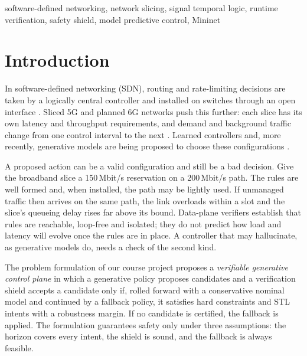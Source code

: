 \documentclass[conference]{IEEEtran}
\begin{document}
\begin{IEEEkeywords}
software-defined networking, network slicing, signal temporal logic, runtime
verification, safety shield, model predictive control, Mininet
\end{IEEEkeywords}

\section{Introduction}

In software-defined networking (SDN), routing and rate-limiting decisions are taken
by a logically central controller and installed on switches through an open
interface \cite{mckeown2008openflow,kreutz2015sdn}. Sliced 5G and planned 6G
networks push this further: each slice has its own latency and throughput
requirements, and demand and background traffic change from one control interval to
the next \cite{foukas2017slicing,saad2020vision6g}. Learned controllers and, more
recently, generative models are being proposed to choose these configurations
\cite{boutaba2018mlnet,mao2016deeprm,leivadeas2023ibn,mondal2023llmconfig}.

A proposed action can be a valid configuration and still be a bad decision. Give
the broadband slice a 150\,Mbit/s reservation on a 200\,Mbit/s path. The rules are
well formed and, when installed, the path may be lightly used. If unmanaged traffic
then arrives on the same path, the link overloads within a slot and the slice's
queueing delay rises far above its bound. Data-plane verifiers
\cite{kazemian2012hsa,khurshid2013veriflow} establish that rules are reachable,
loop-free and isolated; they do not predict how load and latency will evolve once
the rules are in place. A controller that may hallucinate, as generative models do,
needs a check of the second kind.

The problem formulation of our course project \cite{vgcp_formulation} proposes a
\emph{verifiable generative control plane} in which a generative policy proposes
candidates and a verification shield accepts a candidate only if, rolled forward
with a conservative nominal model and continued by a fallback policy, it satisfies
hard constraints and STL intents with a robustness margin. If no candidate is
certified, the fallback is applied. The formulation guarantees safety only under
three assumptions: the horizon covers every intent, the shield is sound, and the
fallback is always feasible.
\end{document}
